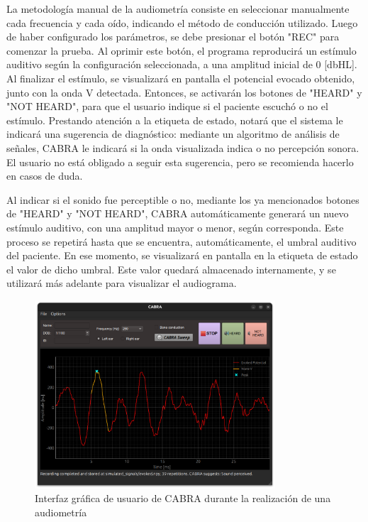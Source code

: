 La metodología manual de la audiometría consiste en seleccionar manualmente cada frecuencia y cada oído, indicando
el método de conducción utilizado.
Luego de haber configurado los parámetros, se debe presionar el botón "REC" para comenzar la prueba.
Al oprimir este botón, el programa reproducirá un estímulo auditivo según la configuración seleccionada, a una
amplitud inicial de 0 [dbHL]. Al finalizar el estímulo, se visualizará en pantalla el potencial evocado obtenido,
junto con la onda V detectada.
Entonces, se activarán los botones de "HEARD" y "NOT HEARD", para que el usuario indique si el paciente escuchó o no
el estímulo.
Prestando atención a la etiqueta de estado, notará que el sistema le indicará una sugerencia de diagnóstico:
mediante un algoritmo de análisis de señales, CABRA le indicará si la onda visualizada indica o no percepción sonora.
El usuario no está obligado a seguir esta sugerencia, pero se recomienda hacerlo en casos de duda.

Al indicar si el sonido fue perceptible o no, mediante los ya mencionados botones de "HEARD" y "NOT HEARD", CABRA
automáticamente generará un nuevo estímulo auditivo, con una amplitud mayor o menor, según corresponda.
Este proceso se repetirá hasta que se encuentra, automáticamente, el umbral auditivo del paciente.
En ese momento, se visualizará en pantalla en la etiqueta de estado el valor de dicho umbral.
Este valor quedará almacenado internamente, y se utilizará más adelante para visualizar el audiograma.


\begin{figure}[H]
    \centering
    \includegraphics[width=0.8\textwidth]{figuras/cabra_gui_test_evoked}
    \caption{Interfaz gráfica de usuario de CABRA durante la realización de una audiometría}
    \label{fig:GUI_manual}
\end{figure}

